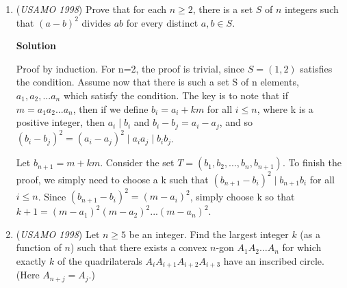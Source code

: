 \begin{enumerate}
 



\textbf{Solution}

Answer: $98$.

 There are $4\cdot97$ adjacent pairs of squares in the border and each pair has one black and one white square. Each move can fix at most $4$ pairs, so we need at least $97$ moves. However, we start with two corners one color and two another, so at least one rectangle must include a corner square. But such a rectangle can only fix two pairs, so at least $98$ moves are needed.

 It is easy to see that 98 moves suffice: take 49 $1\times98$ rectangles (alternate rows), and 49 $98\times1$ rectangles (alternate columns).

 credit: \href{https://mks.mff.cuni.cz/kalva/usa/usoln/usol984.html}{https://mks.mff.cuni.cz/kalva/usa/usoln/usol984.html}

 editor: Brian Joseph

 second editor: integralarefun

 


	\item (\textit{USAMO 1998}) Prove that for each $n\geq 2$, there is a set $S$ of $n$ integers such that $(a-b)^2$ divides $ab$ for every distinct $a,b\in S$.


 



\textbf{Solution}

Proof by induction.  For n=2, the proof is trivial, since $S = (1,2)$ satisfies the condition.  Assume now that there is such a set S of n elements, $a_1, a_2,...a_n$ which satisfy the condition.  The key is to note that if $m=a_1a_2...a_n$, then if we define $b_i=a_i + km$ for all $i\le n$, where k is a positive integer, then $a_i \mid b_i$ and $b_i - b_j = a_i - a_j$, and so $(b_i - b_j)^2 = (a_i - a_j)^2 \mid a_ia_j \mid b_ib_j$.

 Let $b_{n+1}=m +km$.   Consider the set $T = (b_1,b_2,...,b_n,b_{n+1})$. To finish the proof, we simply need to choose a k such that $(b_{n+1}-b_i)^2 \mid b_{n+1}b_i$ for all $i\le n$.  Since $(b_{n+1}-b_i)^2 = (m-a_i)^2$, simply choose k so that $k+1 = (m-a_1)^2(m-a_2)^2...(m-a_n)^2$.

 


	\item (\textit{USAMO 1998}) Let $n \geq 5$ be an integer. Find the largest integer $k$ (as a function of $n$) such that there exists a convex $n$-gon $A_{1}A_{2}\dots A_{n}$ for which exactly $k$ of the quadrilaterals $A_{i}A_{i+1}A_{i+2}A_{i+3}$ have an inscribed circle. (Here $A_{n+j} = A_{j}$.)



\end{enumerate}
